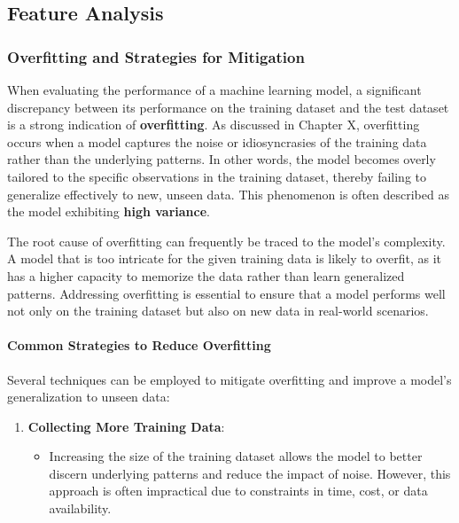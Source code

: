 \documentclass{article}
\providecommand{\tightlist}{%
      \setlength{\itemsep}{0pt}\setlength{\parskip}{0pt}}
\begin{document}
    \subsection{Feature Analysis}\label{feature-analysis}

    \subsubsection{Overfitting and Strategies for
Mitigation}\label{overfitting-and-strategies-for-mitigation}

When evaluating the performance of a machine learning model, a
significant discrepancy between its performance on the training dataset
and the test dataset is a strong indication of \textbf{overfitting}. As
discussed in Chapter X, overfitting occurs when a model captures the
noise or idiosyncrasies of the training data rather than the underlying
patterns. In other words, the model becomes overly tailored to the
specific observations in the training dataset, thereby failing to
generalize effectively to new, unseen data. This phenomenon is often
described as the model exhibiting \textbf{high variance}.

The root cause of overfitting can frequently be traced to the model's
complexity. A model that is too intricate for the given training data is
likely to overfit, as it has a higher capacity to memorize the data
rather than learn generalized patterns. Addressing overfitting is
essential to ensure that a model performs well not only on the training
dataset but also on new data in real-world scenarios.

\paragraph{Common Strategies to Reduce
Overfitting}\label{common-strategies-to-reduce-overfitting}

Several techniques can be employed to mitigate overfitting and improve a
model's generalization to unseen data:

\begin{enumerate}
\def\labelenumi{\arabic{enumi}.}
\tightlist
\item
  \textbf{Collecting More Training Data}:

  \begin{itemize}
  \tightlist
  \item
    Increasing the size of the training dataset allows the model to
    better discern underlying patterns and reduce the impact of noise.
    However, this approach is often impractical due to constraints in
    time, cost, or data availability.
  \end{itemize}
\end{enumerate}
\end{document}
